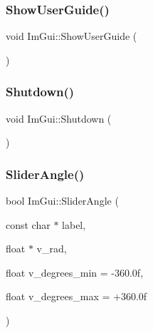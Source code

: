 \subsubsection{\texorpdfstring{Show\+User\+Guide()}{ShowUserGuide()}}
{\footnotesize\ttfamily void Im\+Gui\+::\+Show\+User\+Guide (\begin{DoxyParamCaption}{ }\end{DoxyParamCaption})}

\hypertarget{namespace_im_gui_aeba34069558d4fbcf734a9c92ce3b773}{}\label{namespace_im_gui_aeba34069558d4fbcf734a9c92ce3b773} 
\subsubsection{\texorpdfstring{Shutdown()}{Shutdown()}}
{\footnotesize\ttfamily void Im\+Gui\+::\+Shutdown (\begin{DoxyParamCaption}{ }\end{DoxyParamCaption})}

\hypertarget{namespace_im_gui_ad20170a9fff4ded0076476dad8ec6645}{}\label{namespace_im_gui_ad20170a9fff4ded0076476dad8ec6645} 
\subsubsection{\texorpdfstring{Slider\+Angle()}{SliderAngle()}}
{\footnotesize\ttfamily bool Im\+Gui\+::\+Slider\+Angle (\begin{DoxyParamCaption}\item[{const char $\ast$}]{label,  }\item[{float $\ast$}]{v\+\_\+rad,  }\item[{float}]{v\+\_\+degrees\+\_\+min = {\ttfamily -\/360.0f},  }\item[{float}]{v\+\_\+degrees\+\_\+max = {\ttfamily +360.0f} }\end{DoxyParamCaption})}

\hypertarget{namespace_im_gui_a3d3b2964eeba76dadaa532232c23fc97}{}\label{namespace_im_gui_a3d3b2964eeba76dadaa532232c23fc97} 
